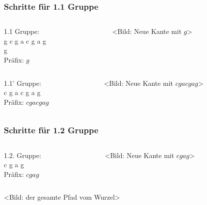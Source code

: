 \documentclass{beamer}
\begin{document}
\begin{frame}[t]
\frametitle{Schritte für 1.1 Gruppe}
    \begin{columns}
        \begin{column}[t]{0.5\textwidth}
            1.1 Gruppe:     \\
            g c g a c g a g \\
            g               \\
            \medskip
            Präfix: $g$
        \end{column}
        \begin{column}[t]{0.5\textwidth}
            <Bild: Neue Kante mit $g$>
        \end{column}
    \end{columns}
    \bigskip
    \begin{columns}
        \begin{column}[t]{0.5\textwidth}
                1.1' Gruppe:    \\
                c g a c g a g   \\
                \medskip
                Präfix: $c g a c g a g$
        \end{column}
        \begin{column}[t]{0.5\textwidth}
             <Bild: Neue Kante mit $c g a c g a g$>
        \end{column}
    \end{columns}
\end{frame}


\begin{frame}[t]
\frametitle{Schritte für 1.2 Gruppe}
    \begin{columns}
        \begin{column}[t]{0.5\textwidth}
            1.2. Gruppe:    \\
            c g a g         \\
            \medskip
            Präfix: $c g a g$
        \end{column}
        \begin{column}[t]{0.5\textwidth}
            <Bild: Neue Kante mit $c g a g$>
        \end{column}
    \end{columns}
    \bigskip
    <Bild: der gesamte Pfad vom Wurzel>
\end{frame}
\end{document}
